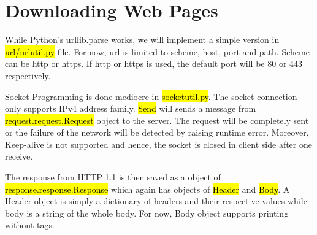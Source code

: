 \documentclass[11pt]{article}
\begin{document}
\section{Downloading Web Pages}

\indent While Python's {\color{blue}urllib.parse} works, we will implement a simple version in \hl{url/urlutil.py} file.
For now, url is limited to scheme, host, port and path. Scheme can be http or https. If http or https is used, the default port will be 80 or 443 respectively.

Socket Programming is done mediocre in \hl{socketutil.py}. The socket connection only supports IPv4 address family. \hl{Send} will sends a message from \hl{request.request.Request} object to the server. The request will be completely sent or the failure of the network will be detected by raising 
runtime error. Moreover, Keep-alive is not supported and hence, the socket is closed in client side after one receive.

The response from HTTP 1.1 is then saved as a object of \hl{response.response.Response} which again has objects of \hl{Header} and \hl{Body}. 
A Header object is simply a dictionary of headers and their respective values while body is a string of the whole body. For now, Body object supports 
printing without tags.
\end{document}
